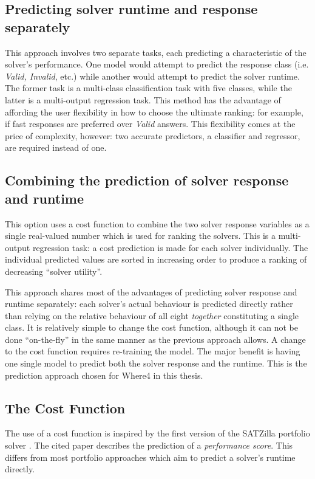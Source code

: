 \subsection{Predicting solver runtime and response separately}
This approach involves two separate tasks, each predicting a characteristic of the solver's performance. 
One model would attempt to predict the response class (i.e. \textit{Valid, Invalid}, etc.) while another would attempt to predict the solver runtime.
The former task is a multi-class classification task with five classes, while the latter is a multi-output regression task.
This method has the advantage of affording the user flexibility in how to choose the ultimate ranking: for example, if fast responses are preferred over \textit{Valid} answers.
This flexibility comes at the price of complexity, however: two accurate predictors, a classifier and regressor, are required instead of one.
\subsection{Combining the prediction of solver response and runtime}
This option uses a cost function to combine the two solver response variables as a single real-valued number which is used for ranking the solvers.
This is a multi-output regression task: a cost prediction is made for each solver individually.
The individual predicted values are sorted in increasing order to produce a ranking of decreasing ``solver utility''.

This approach shares most of the advantages of predicting solver response and runtime separately: each solver's actual behaviour is predicted directly rather than relying on the relative behaviour of all eight \textit{together} constituting a single class. 
It is relatively simple to change the cost function, although it can not be done ``on-the-fly'' in the same manner as the previous approach allows.
A change to the cost function requires re-training the model.
The major benefit is having one single model to predict both the solver response and the runtime. 
This is the prediction approach chosen for \textsf{Where4} in this thesis.  

\subsection{The Cost Function}
\label{sub:scoring}

The use of a cost function is inspired by the first version of the SATZilla portfolio solver \cite{Satzilla}. 
The cited paper describes the prediction of a \textit{performance score}.
This differs from most portfolio approaches which aim to predict a solver's runtime directly. 

